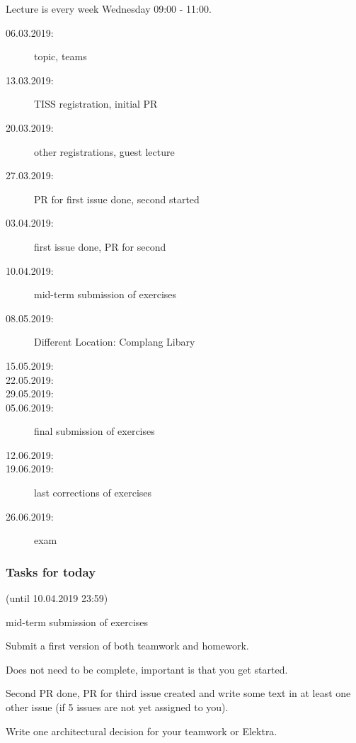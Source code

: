 




\date{10.04.2019}



\renewcommand{\enquote}[1]{\emph{``#1''}} %

\begin{frame}
	\titlepage
	\doclicenseThis
\end{frame}


\begin{frame}
	Lecture is every week Wednesday 09:00 - 11:00.

	\begin{description}
		\item[06.03.2019:] {\color{gray}topic, teams}
		\item[13.03.2019:] {\color{gray}TISS registration, initial PR}
		\item[20.03.2019:] {\color{gray}other registrations, guest lecture}
		\item[27.03.2019:] {\color{gray}PR for first issue done, second started}
		\item[03.04.2019:] {\color{gray}first issue done, PR for second}
		\item[10.04.2019:] {\color{red}mid-term submission of exercises}
		\item[08.05.2019:] {\color{orange}Different Location: Complang Libary}
		\item[15.05.2019:]
		\item[22.05.2019:]
		\item[29.05.2019:]
		\item[05.06.2019:] final submission of exercises
		\item[12.06.2019:]
		\item[19.06.2019:] last corrections of exercises
		\item[26.06.2019:] exam
	\end{description}
\end{frame}

\begin{assignment}
	\frametitle{Tasks for today}
	(until 10.04.2019 23:59)

	mid-term submission of exercises
	
	\begin{task}
	Submit a first version of both teamwork and homework.
	\end{task}

	Does not need to be complete, important is that you get started.

	\begin{task}
	Second PR done, PR for third issue created and write some text in at least one other issue (if 5 issues are not yet assigned to you).
	\end{task}

	\begin{task}
	Write one architectural decision for your teamwork or Elektra.
	\end{task}
\end{assignment}

